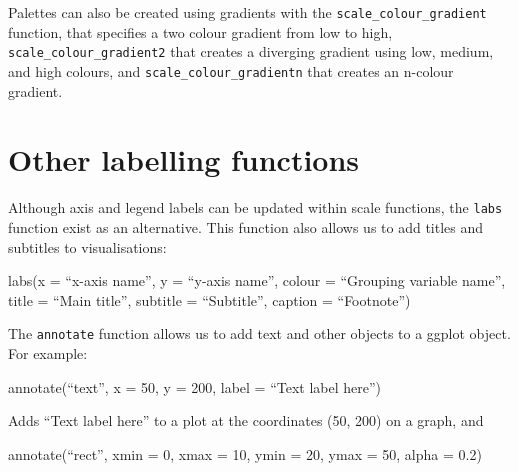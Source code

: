 \documentclass[
  letterpaper,
  DIV=11,
  numbers=noendperiod]{scrreprt}
\newenvironment{Shaded}{\begin{snugshade}}{\end{snugshade}}
\newcommand{\AttributeTok}[1]{\textcolor[rgb]{0.40,0.45,0.13}{#1}}
\newcommand{\DecValTok}[1]{\textcolor[rgb]{0.68,0.00,0.00}{#1}}
\newcommand{\FloatTok}[1]{\textcolor[rgb]{0.68,0.00,0.00}{#1}}
\newcommand{\FunctionTok}[1]{\textcolor[rgb]{0.28,0.35,0.67}{#1}}
\newcommand{\NormalTok}[1]{\textcolor[rgb]{0.00,0.23,0.31}{#1}}
\newcommand{\SpecialCharTok}[1]{\textcolor[rgb]{0.37,0.37,0.37}{#1}}
\begin{document}
Palettes can also be created using gradients with the
\texttt{scale\_colour\_gradient} function, that specifies a two colour
gradient from low to high, \texttt{scale\_colour\_gradient2} that
creates a diverging gradient using low, medium, and high colours, and
\texttt{scale\_colour\_gradientn} that creates an n-colour gradient.

\section{Other labelling functions}\label{other-labelling-functions}

Although axis and legend labels can be updated within scale functions,
the \texttt{labs} function exist as an alternative. This function also
allows us to add titles and subtitles to visualisations:

\begin{Shaded}
\begin{Highlighting}[]
\FunctionTok{labs}\NormalTok{(}\AttributeTok{x =}\NormalTok{ “x}\SpecialCharTok{{-}}\NormalTok{axis name”, }\AttributeTok{y =}\NormalTok{ “y}\SpecialCharTok{{-}}\NormalTok{axis name”,}
    \AttributeTok{colour =}\NormalTok{ “Grouping variable name”, }\AttributeTok{title =}\NormalTok{ “Main title”,}
    \AttributeTok{subtitle =}\NormalTok{ “Subtitle”, }\AttributeTok{caption =}\NormalTok{ “Footnote”)}
\end{Highlighting}
\end{Shaded}

The \texttt{annotate} function allows us to add text and other objects
to a ggplot object. For example:

\begin{Shaded}
\begin{Highlighting}[]
\FunctionTok{annotate}\NormalTok{(“text”, }\AttributeTok{x =} \DecValTok{50}\NormalTok{, }\AttributeTok{y =} \DecValTok{200}\NormalTok{, }\AttributeTok{label =}\NormalTok{ “Text label here”)}
\end{Highlighting}
\end{Shaded}

Adds ``Text label here'' to a plot at the coordinates (50, 200) on a
graph, and

\begin{Shaded}
\begin{Highlighting}[]
\FunctionTok{annotate}\NormalTok{(“rect”, }\AttributeTok{xmin =} \DecValTok{0}\NormalTok{, }\AttributeTok{xmax =} \DecValTok{10}\NormalTok{, }\AttributeTok{ymin =} \DecValTok{20}\NormalTok{, }\AttributeTok{ymax =} \DecValTok{50}\NormalTok{, }\AttributeTok{alpha =} \FloatTok{0.2}\NormalTok{)}
\end{Highlighting}
\end{Shaded}
\end{document}
